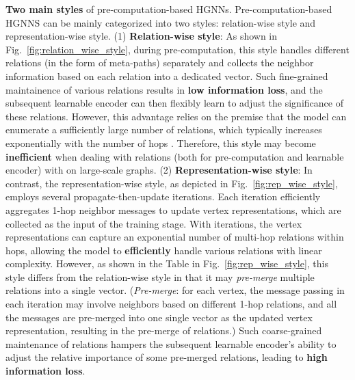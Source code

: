 \documentclass[lettersize,journal]{IEEEtran}
\begin{document}
\textbf{Two main styles} of pre-computation-based HGNNs.
Pre-computation-based HGNNS can be mainly categorized into two styles: relation-wise style and representation-wise style.
(1) \textbf{Relation-wise style}: As shown in Fig.~\ref{fig:relation_wise_style}, during pre-computation, this style handles different relations (in the form of meta-paths) separately and collects the neighbor information based on each relation into a dedicated vector.
Such fine-grained maintainence of various relations results in \textbf{low information loss}, and the subsequent learnable encoder can then flexibly learn to adjust the significance of these relations.
However, this advantage relies on the premise that the model can enumerate a sufficiently large number of relations, which typically increases exponentially with the number of hops . 
Therefore, this style may become \textbf{inefficient} when dealing with relations (both for pre-computation and learnable encoder) with  on large-scale graphs.
(2) \textbf{Representation-wise style}: In contrast, the representation-wise style, as depicted in Fig.~\ref{fig:rep_wise_style}, employs several propagate-then-update iterations. 
Each iteration efficiently aggregates 1-hop neighbor messages to update vertex representations, which are collected as the input of the training stage. 
With  iterations, the vertex representations can capture an exponential number of multi-hop relations within  hops, allowing the model to \textbf{efficiently} handle various relations with linear complexity.
However, as shown in the Table in Fig.~\ref{fig:rep_wise_style}, this style differs from the relation-wise style in that it may \textit{pre-merge} multiple relations into a single vector.
(\textit{Pre-merge}: for each vertex, the message passing in each iteration may involve neighbors based on different 1-hop relations, and all the messages are pre-merged into one single vector as the updated vertex representation, resulting in the pre-merge of relations.)
Such coarse-grained maintenance of relations hampers the subsequent learnable encoder's ability to adjust the relative importance of some pre-merged relations, leading to \textbf{high information loss}.
\end{document}
